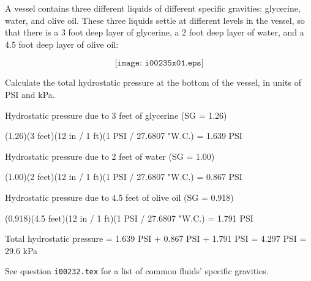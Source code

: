 

A vessel contains three different liquids of different specific gravities: glycerine, water, and olive oil.  These three liquids settle at different levels in the vessel, so that there is a 3 foot deep layer of glycerine, a 2 foot deep layer of water, and a 4.5 foot deep layer of olive oil:

$$\texttt{[image: i00235x01.eps]}$$

Calculate the total hydrostatic pressure at the bottom of the vessel, in units of PSI and kPa.







Hydrostatic pressure due to 3 feet of glycerine (SG = 1.26)

\vskip 10pt

(1.26)(3 feet)(12 in / 1 ft)(1 PSI / 27.6807 "W.C.) = 1.639 PSI

\vskip 20pt

Hydrostatic pressure due to 2 feet of water (SG = 1.00)

\vskip 10pt

(1.00)(2 feet)(12 in / 1 ft)(1 PSI / 27.6807 "W.C.) = 0.867 PSI

\vskip 20pt

Hydrostatic pressure due to 4.5 feet of olive oil (SG = 0.918)

\vskip 10pt

(0.918)(4.5 feet)(12 in / 1 ft)(1 PSI / 27.6807 "W.C.) = 1.791 PSI

\vskip 20pt

Total hydrostatic pressure = 1.639 PSI + 0.867 PSI + 1.791 PSI = 4.297 PSI = 29.6 kPa







See question {\tt i00232.tex} for a list of common fluids' specific gravities.




